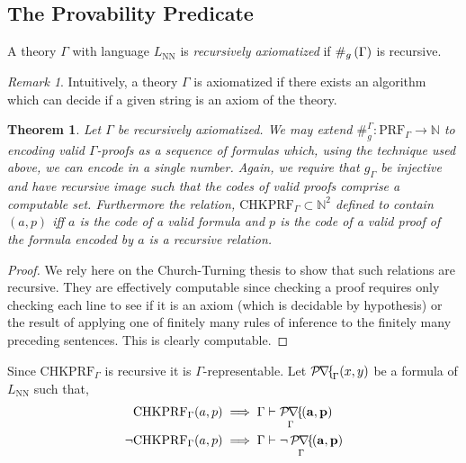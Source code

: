 \documentclass[12pt, leqno]{article}
\newcommand{\N}{\mathbb{N}}
\renewcommand{\bf}[1]{\mathbf{#1}}
\newcommand{\proves}{\vdash}
\newcommand{\PRF}[1]{\mathrm{PRF}_{#1}}
\newenvironment{definition}[1][Definition:]{\begin{trivlist}
\item[\hskip \labelsep {\bfseries #1}]}{\end{trivlist}}
\theoremstyle{theorem}
\newtheorem{theorem}{Theorem}[section]
\theoremstyle{definition}
\theoremstyle{definition}
\theoremstyle{remark}
\theoremstyle{definition}
\theoremstyle{remark}
\newtheorem{remark}{Remark}[subsection]
\DeclareMathOperator{\Prf}{\mathcal{P\mkern-2mu r\mkern-2.5mu f\mkern-2mu}}
\begin{document}
\subsection{The Provability Predicate}

\begin{definition}
A theory $\Gamma$ with language $L_{\text{NN}}$ is \textit{recursively axiomatized} if $\#_g\left( \Gamma \right)$ is recursive. 
\end{definition}

\begin{remark}
Intuitively, a theory $\Gamma$ is axiomatized if there exists an algorithm which can decide if a given string is an axiom of the theory. 
\end{remark}

\newcommand{\CHKPRF}{\mathrm{CHKPRF}}

\begin{theorem}
Let $\Gamma$ be recursively axiomatized. We may extend $\#_g^\Gamma : \PRF{\Gamma} \to \N$ to encoding valid $\Gamma$-proofs as a sequence of formulas which, using the technique used above, we can encode in a single number. Again, we require that $g_{\Gamma}$ be injective and have recursive image such that the codes of valid proofs comprise a computable set. Furthermore the relation, $\CHKPRF_{\Gamma} \subset \N^2$ defined to contain $(a, p)$ iff $a$ is the code of a valid formula and $p$ is the code of a valid proof of the formula encoded by $a$ is a recursive relation. 
\end{theorem}

\begin{proof}
We rely here on the Church-Turning thesis to show that such relations are recursive. They are effectively computable since checking a proof requires only checking each line to see if it is an axiom (which is decidable by hypothesis) or the result of applying one of finitely many rules of inference to the finitely many preceding sentences. This is clearly computable. 
\end{proof}


\begin{definition}
Since $\CHKPRF_{\Gamma}$ is recursive it is $\Gamma$-representable. Let $\Prf_{\Gamma}(x,y)$ be a formula of $L_{\text{NN}}$ such that,
\begin{align*}
\CHKPRF_{\Gamma}(a,p) & \implies \Gamma \proves \Prf_{\Gamma}(\bf{a}, \bf{p})
\\
\neg \CHKPRF_{\Gamma}(a,p) & \implies \Gamma \proves \neg \Prf_{\Gamma}(\bf{a}, \bf{p})
\end{align*}
\end{definition}
\end{document}
